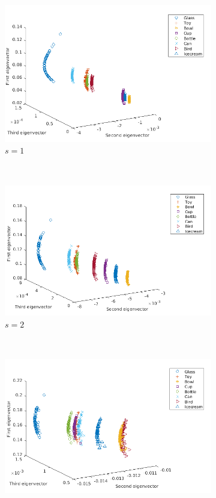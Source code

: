 \documentclass[10pt,a4paper]{article}
\begin{document}
\begin{figure}[H]
	\centering
	\begin{subfigure}[b]{0.5\textwidth}
		\includegraphics[width= \textwidth]{images/Zeta-Mellin1.png}
		\caption{$s=1$}
		\label{}
	\end{subfigure}~
	\begin{subfigure}[b]{0.5\textwidth}
		\includegraphics[width= \textwidth]{images/Zeta-Mellin2.png}
		\caption{$s=2$}
		\label{}
	\end{subfigure}\\
	\begin{subfigure}[b]{0.5\textwidth}
		\includegraphics[width= \textwidth]{images/Zeta-Mellin4.png}

\end{subfigure}
\end{figure}
\end{document}
